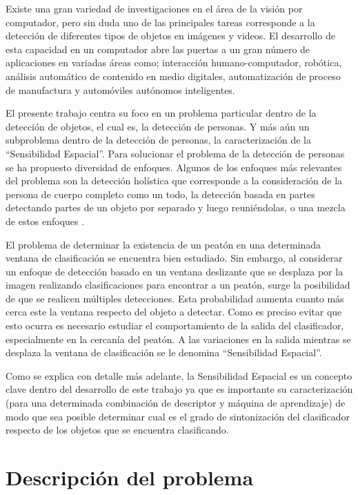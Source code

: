 Existe una gran variedad de investigaciones en el área de la visión por computador, pero sin duda uno de las principales tareas corresponde a la detección de diferentes tipos de objetos en imágenes y videos. El desarrollo de esta capacidad en un computador abre las puertas a un gran número de aplicaciones en variadas áreas como; interacción humano-computador, robótica, análisis automático de contenido en medio digitales, automatización de proceso de manufactura y automóviles autónomos inteligentes.

El presente trabajo centra su foco en un problema particular dentro de la detección de objetos, el cual es, la detección de personas. Y más aún un subproblema dentro de la detección de personas, la caracterización de la ``Sensibilidad Espacial''. Para solucionar el problema de la detección de personas se ha propuesto diversidad de enfoques. Algunos de los enfoques más relevantes del problema son la detección holística \citep{dalal2006}  que corresponde a la consideración de la persona de cuerpo completo como un todo, la detección basada en partes \citep{nevatia2005} detectando partes de un objeto por separado y luego reuniéndolas, o una mezcla de estos enfoques \citep{leibe2005,yu2011}.

El problema de determinar la existencia de un peatón en una determinada ventana de clasificación se encuentra bien estudiado. Sin embargo, al considerar un enfoque de detección basado en un ventana deslizante que se desplaza por la imagen realizando clasificaciones para encontrar a un peatón, surge la posibilidad de que se realicen múltiples detecciones. Esta probabilidad aumenta cuanto más cerca este la ventana respecto del objeto a detectar. Como es preciso evitar que esto ocurra es necesario estudiar el comportamiento de la salida del clasificador, especialmente en la cercanía del peatón. A las variaciones en la salida mientras se desplaza la ventana de clasificación se le denomina ``Sensibilidad Espacial''.

Como se explica con detalle más adelante, la Sensibilidad Espacial es un concepto clave dentro del desarrollo de este trabajo ya que es importante su caracterización (para una determinada combinación de descriptor y máquina de aprendizaje) de modo que sea posible determinar cual es el grado de sintonización del clasificador respecto de los objetos que se encuentra clasificando.

\section{Descripci\'on del problema}
\label{intro:problema}

